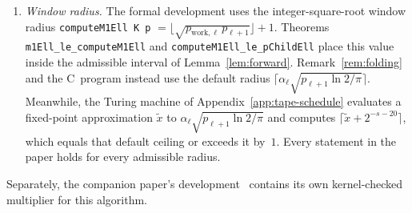 \begin{enumerate}[label=(\arabic*),leftmargin=*]
\item \emph{Window radius.} The formal development uses the integer-square-root window radius \texttt{computeM1Ell K p} $= \lfloor\sqrt{p_{\mathrm{work},\ell}\,p_{\ell+1}}\rfloor + 1$. Theorems \texttt{m1Ell\_\allowbreak le\_\allowbreak compute\allowbreak M1Ell} and \texttt{compute\allowbreak M1Ell\_\allowbreak le\_\allowbreak pChildEll} place this value inside the admissible interval of Lemma~\ref{lem:forward}. Remark~\ref{rem:folding} and the C~program instead use the default radius $\lceil \alpha_\ell\sqrt{p_{\ell+1}\ln 2/\pi} \rceil$. Meanwhile, the Turing machine of Appendix~\ref{app:tape-schedule} evaluates a fixed-point approximation $\tilde{x}$ to $\alpha_\ell\sqrt{p_{\ell+1}\ln 2/\pi}$ and computes $\lceil \tilde{x} + 2^{-s-20} \rceil$, which equals that default ceiling or exceeds it by~$1$. Every statement in the paper holds for every admissible radius.
\end{enumerate}

Separately, the companion paper's development~\cite{CLW26} contains its own kernel-checked multiplier for this algorithm.
